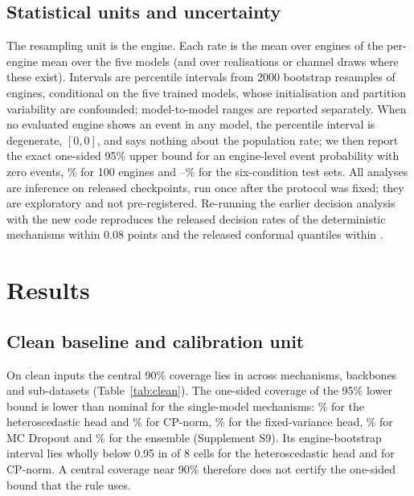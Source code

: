 \subsection{Statistical units and uncertainty}
The resampling unit is the engine. Each rate is the mean over engines of the per-engine mean over the five models (and over realisations or channel draws where these exist). Intervals are percentile intervals from 2000 bootstrap resamples of engines, conditional on the five trained models, whose initialisation and partition variability are confounded; model-to-model ranges are reported separately. When no evaluated engine shows an event in any model, the percentile interval is degenerate, $[0,0]$, and says nothing about the population rate; we then report the exact one-sided 95\% upper bound for an engine-level event probability with zero events, \RVZeroUpperOne\% for 100 engines and \RVZeroUpperTwo--\RVZeroUpperFour\% for the six-condition test sets. All analyses are inference on released checkpoints, run once after the protocol was fixed; they are exploratory and not pre-registered. Re-running the earlier decision analysis with the new code reproduces the released decision rates of the deterministic mechanisms within 0.08 points and the released conformal quantiles within \RVCPqDiff.

\section{Results}\label{sec:results}
\subsection{Clean baseline and calibration unit}\label{sec:clean}
On clean inputs the central 90\% coverage lies in \JCleanCovAll{} across mechanisms, backbones and sub-datasets (Table~\ref{tab:clean}). The one-sided coverage of the 95\% lower bound is lower than nominal for the single-model mechanisms: \RVCovOneNLL\% for the heteroscedastic head and \RVCovOneCP\% for CP-norm, \RVCovOneFix\% for the fixed-variance head, \RVCovOneMC\% for MC Dropout and \RVCovOneEns\% for the ensemble (Supplement S9). Its engine-bootstrap interval lies wholly below 0.95 in \RVCovOneNLLBelow{} of 8 cells for the heteroscedastic head and \RVCovOneCPBelow{} for CP-norm. A central coverage near 90\% therefore does not certify the one-sided bound that the rule uses.

